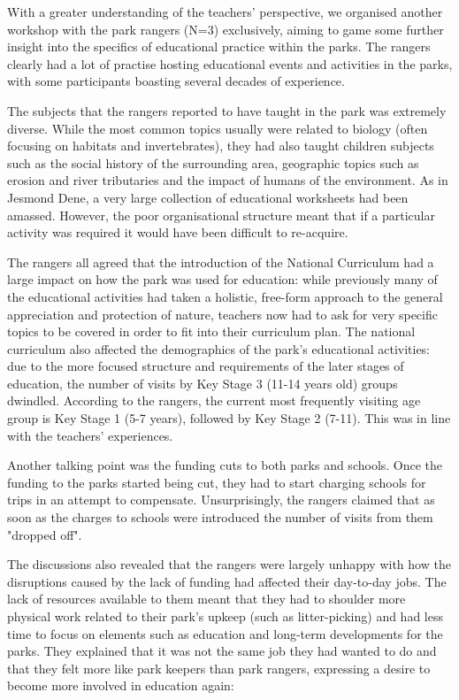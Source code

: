 With a greater understanding of the teachers’ perspective, we organised another workshop with the park rangers (N=3) exclusively, aiming to game some further insight into the specifics of educational practice within the parks. The rangers clearly had a lot of practise hosting educational events and activities in the parks, with some participants boasting several decades of experience.

The subjects that the rangers reported to have taught in the park was extremely diverse. While the most common topics usually were related to biology (often focusing on habitats and invertebrates), they had also taught children subjects such as the social history of the surrounding area, geographic topics such as erosion and river tributaries and the impact of humans of the environment. As in Jesmond Dene, a very large collection of educational worksheets had been amassed. However, the poor organisational structure meant that if a particular activity was required it would have been difficult to re-acquire.

The rangers all agreed that the introduction of the National Curriculum had a large impact on how the park was used for education: while previously many of the educational activities had taken a holistic, free-form approach to the general appreciation and protection of nature, teachers now had to ask for very specific topics to be covered in order to fit into their curriculum plan. The national curriculum also affected the demographics of the park’s educational activities: due to the more focused structure and requirements of the later stages of education, the number of visits by Key Stage 3 (11-14 years old) groups dwindled. According to the rangers, the current most frequently visiting age group is Key Stage 1 (5-7 years), followed by Key Stage 2 (7-11). This was in line with the teachers’ experiences.

Another talking point was the funding cuts to both parks and schools. Once the funding to the parks started being cut, they had to start charging schools for trips in an attempt to compensate. Unsurprisingly, the rangers claimed that as soon as the charges to schools were introduced the number of visits from them "dropped off".

The discussions also revealed that the rangers were largely unhappy with how the disruptions caused by the lack of funding had affected their day-to-day jobs. The lack of resources available to them meant that they had to shoulder more physical work related to their park’s upkeep (such as litter-picking) and had less time to focus on elements such as education and long-term developments for the parks. They explained that it was not the same job they had wanted to do and that they felt more like park keepers than park rangers, expressing a desire to become more involved in education again:

